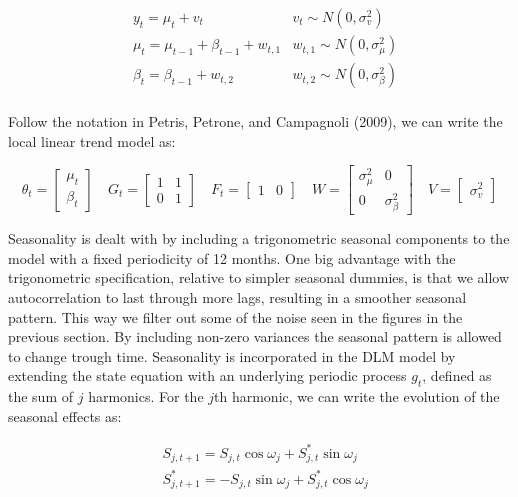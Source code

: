 \documentclass[]{article}
\begin{document}
\[
\begin{aligned}
& y_{t} = \mu_{t} + v_{t} & v_{t} \sim N(0, \sigma_{v}^{2}) \\
& \mu_{t} = \mu_{t-1} + \beta_{t-1} + w_{t,1} &w_{t,1} \sim N(0, \sigma_{\mu}^{2}) \\
& \beta_{t} = \beta_{t-1} + w_{t,2} &w_{t,2} \sim N(0, \sigma_{\beta}^{2}) \\
\end{aligned}
\]

Follow the notation in Petris, Petrone, and Campagnoli (2009), we can
write the local linear trend model as:

\[
\theta_{t} = \begin{bmatrix} \mu_t \\ \beta_{t} \end{bmatrix} \quad 
G_{t} = \begin{bmatrix} 1 & 1 \\ 0 & 1 \end{bmatrix} \quad 
F_{t} = \begin{bmatrix} 1 & 0 \end{bmatrix} \quad
W = \begin{bmatrix} \sigma_{\mu}^{2} & 0 \\ 0 & \sigma_{\beta}^{2} \end{bmatrix} \quad
V = \begin{bmatrix} \sigma_{v}^{2} \end{bmatrix}
\]

Seasonality is dealt with by including a trigonometric seasonal
components to the model with a fixed periodicity of 12 months. One big
advantage with the trigonometric specification, relative to simpler
seasonal dummies, is that we allow autocorrelation to last through more
lags, resulting in a smoother seasonal pattern. This way we filter out
some of the noise seen in the figures in the previous section. By
including non-zero variances the seasonal pattern is allowed to change
trough time. Seasonality is incorporated in the DLM model by extending
the state equation with an underlying periodic process \(g_{t}\),
defined as the sum of \(j\) harmonics. For the \(j\)th harmonic, we can
write the evolution of the seasonal effects as:

\[
\begin{aligned}
&S_{j, t+1} = S_{j, t} \cos \omega_{j} + S_{j, t}^{*} \sin \omega_{j} \\ 
&S_{j, t+1}^{*} = - S_{j, t} \sin \omega_{j} + S_{j, t}^{*} \cos \omega_{j} \\
\end{aligned}
\]
\end{document}
